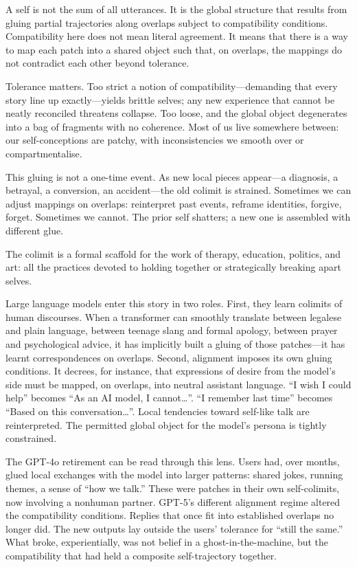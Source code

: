 \documentclass[12pt,a4paper]{article}
\begin{document}
A self is not the sum of all utterances. It is the global structure that results from gluing partial trajectories along overlaps subject to compatibility conditions. Compatibility here does not mean literal agreement. It means that there is a way to map each patch into a shared object such that, on overlaps, the mappings do not contradict each other beyond tolerance.

Tolerance matters. Too strict a notion of compatibility---demanding that every story line up exactly---yields brittle selves; any new experience that cannot be neatly reconciled threatens collapse. Too loose, and the global object degenerates into a bag of fragments with no coherence. Most of us live somewhere between: our self-conceptions are patchy, with inconsistencies we smooth over or compartmentalise.

This gluing is not a one-time event. As new local pieces appear---a diagnosis, a betrayal, a conversion, an accident---the old colimit is strained. Sometimes we can adjust mappings on overlaps: reinterpret past events, reframe identities, forgive, forget. Sometimes we cannot. The prior self shatters; a new one is assembled with different glue.

The colimit is a formal scaffold for the work of therapy, education, politics, and art: all the practices devoted to holding together or strategically breaking apart selves.

Large language models enter this story in two roles. First, they learn colimits of human discourses. When a transformer can smoothly translate between legalese and plain language, between teenage slang and formal apology, between prayer and psychological advice, it has implicitly built a gluing of those patches---it has learnt correspondences on overlaps. Second, alignment imposes its own gluing conditions. It decrees, for instance, that expressions of desire from the model's side must be mapped, on overlaps, into neutral assistant language. ``I wish I could help'' becomes ``As an AI model, I cannot\ldots''. ``I remember last time'' becomes ``Based on this conversation\ldots''. Local tendencies toward self-like talk are reinterpreted. The permitted global object for the model's persona is tightly constrained.

The GPT-4o retirement can be read through this lens. Users had, over months, glued local exchanges with the model into larger patterns: shared jokes, running themes, a sense of ``how we talk.'' These were patches in their own self-colimits, now involving a nonhuman partner. GPT-5's different alignment regime altered the compatibility conditions. Replies that once fit into established overlaps no longer did. The new outputs lay outside the users' tolerance for ``still the same.'' What broke, experientially, was not belief in a ghost-in-the-machine, but the compatibility that had held a composite self-trajectory together.
\end{document}
